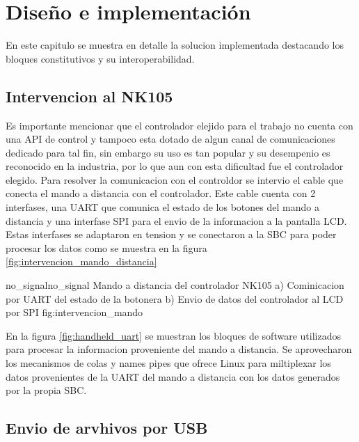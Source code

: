 \chapter{Diseño e implementación} %

\label{Chapter3} 

En este capitulo se muestra en detalle la solucion implementada destacando los bloques constitutivos y su interoperabilidad.


\section{Intervencion al NK105}

   Es importante mencionar que el controlador elejido para el trabajo no cuenta con una API de control y tampoco esta dotado de algun canal de comunicaciones dedicado para tal fin, sin embargo su uso es tan popular y su desempenio es reconocido en la industria, por lo que aun con esta dificultad fue el controlador elegido.
   Para resolver la comunicacion con el controldor se intervio el cable que conecta el mando a distancia con el controlador.
   Este cable cuenta con 2 interfases, una UART que comunica el estado de los botones del mando a distancia y una interfase SPI para el envio de la informacion a la pantalla LCD.
Estas interfases se adaptaron en tension y se conectaron a la SBC para poder procesar los datos como se muestra en la figura \ref{fig:intervencion_mando_distancia}

         {no_signal}{no_signal}
         {Mando a distancia del controlador NK105 a) Cominicacion por UART del estado de la botonera b) Envio de datos del controlador al LCD por SPI}
         {fig:intervencion_mando}

En la figura \ref{fig:handheld_uart} se muestran los bloques de software utilizados para procesar la informacion proveniente del mando a distancia.
   Se aprovecharon los mecanismos de colas y names pipes que ofrece Linux para miltiplexar los datos provenientes de la UART del mando a distancia con los datos generados por la propia SBC.


\section{Envio de arvhivos por USB}

